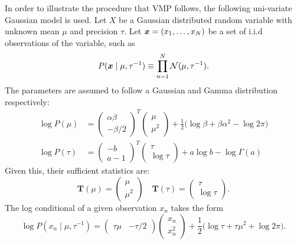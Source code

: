 In order to illustrate the procedure that VMP follows, the following uni-variate Gaussian model is used. Let \(X\) be a Gaussian distributed random variable with unknown mean \(\mu\) and precision \(\tau\). Let \(\bm{x} = (x_{1},\dots,x_{N})\) be a set of i.i.d observations of the variable, such as
\[
  P(\bm{x} \mid \mu, \tau^{-1}) \equiv \prod_{n=1}^{N}\mathcal{N}(\mu, \tau^{-1}).
\]
The parameters are assumed to follow a Gaussian and Gamma distribution respectively:
\[
  \begin{aligned}
    \log P(\mu) &= \begin{pmatrix} \alpha \beta \\ -\beta/2 \end{pmatrix}^{T}\begin{pmatrix} \mu \\ \mu^{2} \end{pmatrix} + \frac{1}{2}\big( \log \beta + \beta \alpha^{2} - \log 2\pi \big)\\
    \log P(\tau) &= \begin{pmatrix} -b \\ a - 1 \end{pmatrix}^{T}\begin{pmatrix} \tau \\ \log \tau \end{pmatrix} + a \log b - \log \Gamma (a)
  \end{aligned}
\]
Given this, their sufficient statistics are:
\[
  \bm{T}(\mu) = \begin{pmatrix} \mu \\ \mu^{2} \end{pmatrix} \quad \bm{T}(\tau) = \begin{pmatrix} \tau \\ \log \tau \end{pmatrix}.
\]
The log conditional of a given observation \(x_{n}\) takes the form
\[
  \log P(x_{n} \mid \mu, \tau^{-1}) = \begin{pmatrix} \tau \mu & - \tau/2 \end{pmatrix} \begin{pmatrix} x_{n} \\ x_{n}^{2} \end{pmatrix} + \frac{1}{2}\big( \log \tau + \tau \mu^{2} + \log 2\pi \big).
\]

